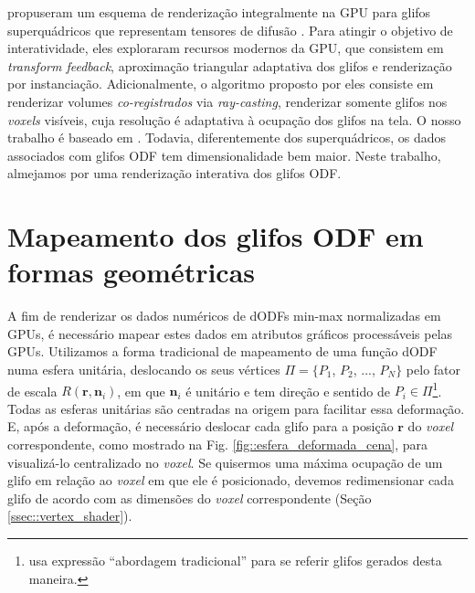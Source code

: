  propuseram um esquema de renderização integralmente na GPU para glifos superquádricos que representam tensores de difusão \cite{Kindlmann2004}. Para atingir o objetivo de interatividade, eles exploraram recursos modernos da GPU, que consistem em \textit{transform feedback}, aproximação triangular adaptativa dos glifos e renderização por instanciação. Adicionalmente, o algoritmo proposto por eles consiste em renderizar volumes \textit{co-registrados} via \textit{ray-casting}, renderizar somente glifos nos \textit{voxels} visíveis, cuja resolução 
é adaptativa à ocupação dos glifos na tela. O nosso trabalho é baseado em . Todavia, diferentemente dos superquádricos, os dados associados com glifos ODF tem dimensionalidade bem maior. Neste trabalho, almejamos por uma renderização interativa dos glifos ODF.

\section{Mapeamento dos glifos ODF em formas geométricas}
\label{sec::renderizacao_de_glifos_ODF}


A fim de renderizar os dados numéricos de dODFs min-max normalizadas em GPUs, é necessário mapear estes dados em atributos gráficos processáveis pelas GPUs. Utilizamos a forma tradicional de mapeamento de uma função dODF numa esfera unitária, deslocando os seus vértices $\Pi = \{
P_1$,
$P_2$, ...,
$P_N
\}$
pelo fator de escala $R(\mathbf{r}, \mathbf{n}_i)$, em que $\mathbf{n}_i$ é unitário e tem direção e sentido de $P_i \in \Pi$\footnote{ usa expressão ``abordagem tradicional'' para se referir glifos gerados desta maneira.}. Todas as esferas unitárias são centradas na origem para facilitar essa deformação. E, após a deformação, é necessário deslocar cada glifo para a posição $\mathbf{r}$ do \textit{voxel} correspondente, como mostrado na Fig. \ref{fig::esfera_deformada_cena}, para visualizá-lo centralizado no \textit{voxel}. Se quisermos uma máxima ocupação de um glifo em relação ao \textit{voxel} em que ele é posicionado, devemos redimensionar cada glifo de acordo com as dimensões do \textit{voxel} correspondente (Seção \ref{ssec::vertex_shader}).

